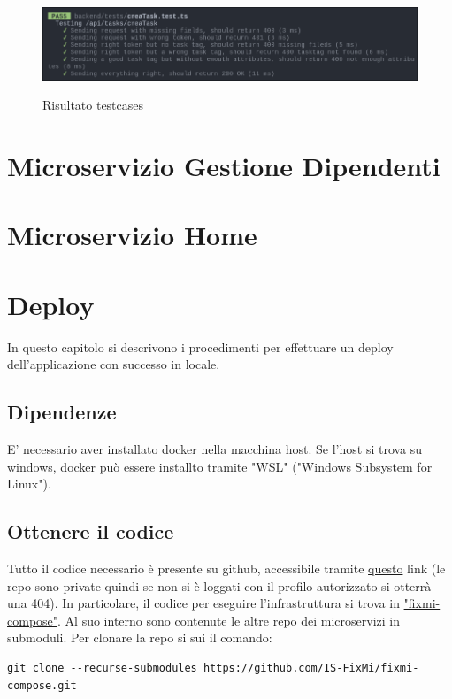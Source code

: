 \documentclass{report}
\begin{document}
\begin{figure}[H]
	\centering\includegraphics[width=1\textwidth]{images/jest_crea_task.png}
	
	Risultato testcases
\end{figure}

\chapter{Microservizio Gestione Dipendenti}

\chapter{Microservizio Home}

\chapter{Deploy}

In questo capitolo si descrivono i procedimenti per effettuare un deploy dell'applicazione con successo in locale. 

\section{Dipendenze}
E' necessario aver installato docker nella macchina host. Se l'host si trova su windows, docker può essere installto tramite "WSL" ("Windows Subsystem for Linux").

\section{Ottenere il codice}
Tutto il codice necessario è presente su github, accessibile tramite \href{https://github.com/orgs/IS-FixMi/repositories}{questo} link (le repo sono private quindi se non si è loggati con il profilo autorizzato si otterrà una 404). In particolare, il codice per eseguire l'infrastruttura si trova in \href{https://github.com/IS-FixMi/fixmi-compose}{"fixmi-compose"}. Al suo interno sono contenute le altre repo dei microservizi in submoduli. Per clonare la repo si sui il comando:
\begin{verbatim}
git clone --recurse-submodules https://github.com/IS-FixMi/fixmi-compose.git
\end{verbatim}
\end{document}
